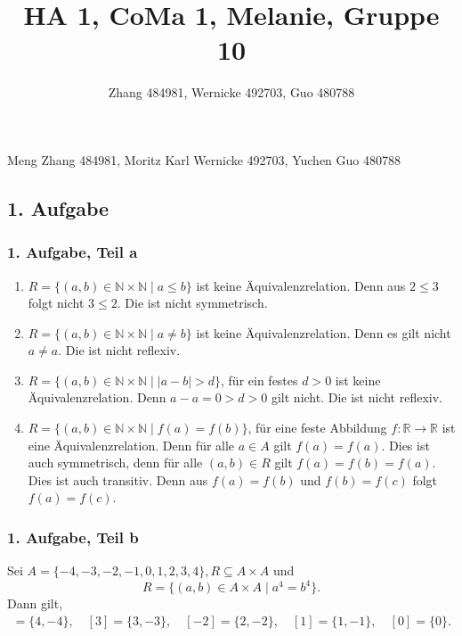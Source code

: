 \documentclass[a5paper]{article}
\title{HA 1, CoMa 1, Melanie, Gruppe 10}
\author{Zhang 484981, Wernicke 492703, Guo 480788}
\providecommand{\abs}[1]{\left\lvert#1\right\rvert}
\theoremstyle{remark}
\begin{document}
\maketitle
\begin{center}
  Meng Zhang 484981, Moritz Karl Wernicke 492703, Yuchen Guo 480788
\end{center}

\newpage

\subsection*{1. Aufgabe}
\subsubsection*{1. Aufgabe, Teil a}
\begin{enumerate}
\item \(R = \{(a, b) \in \mathbb{N} \times \mathbb{N} \mid a \le b\}\) ist keine Äquivalenzrelation.
  Denn aus \(2 \le 3\) folgt nicht \(3 \le 2\).  Die ist nicht symmetrisch.
\item \(R = \{(a, b) \in \mathbb{N} \times \mathbb{N} \mid a \ne b\}\) ist keine Äquivalenzrelation.
  Denn es gilt nicht \(a \ne a\).  Die ist nicht reflexiv.
\item
  \(R = \{(a, b) \in \mathbb{N} \times \mathbb{N} \mid \abs{a - b} > d\}\), für ein festes
  \(d > 0\) ist keine Äquivalenzrelation.  Denn
  \( a - a = 0 > d > 0 \) gilt nicht.  Die ist nicht reflexiv.
\item \(R = \{(a, b) \in \mathbb{N} \times \mathbb{N} \mid f(a) = f(b)\}\), für eine feste Abbildung
  \(f\colon \mathbb{R} \to \mathbb{R}\) ist eine Äquivalenzrelation.  Denn für alle \(a \in A\) gilt
  \(f(a) = f(a)\).  Dies ist auch symmetrisch, denn für alle \((a, b) \in
  R\) gilt \(f(a) = f(b) = f(a)\).  Dies ist auch transitiv.  Denn aus
  \(f(a) = f(b)\) und \(f(b) = f(c)\) folgt \(f(a) = f(c)\).
\end{enumerate}
\subsubsection*{1. Aufgabe, Teil b}
Sei \(A = \{-4, -3, -2, -1, 0, 1, 2, 3, 4\}, R \subseteq A \times A\) und \[ R =
  \{(a, b) \in A \times A \mid a^{4} = b^{4}\}.\]
Dann gilt,
\begin{align*}
  [4] = \{4, -4\}, \quad [3] = \{3, -3\}, \quad [-2] = \{2, -2\}, \quad [1] = \{1,
  -1\}, \quad [0] = \{0\}.
\end{align*}
\end{document}
